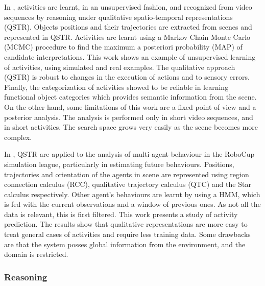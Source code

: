 In \citep{Sridhar10_PhD_UnsupervisedLearningEvent}, activities are learnt, in an unsupervised fashion, and recognized from video sequences by reasoning under qualitative spatio-temporal representations (QSTR). 
Objects positions and their trajectories are extracted from scenes and represented in QSTR.
Activities are learnt using a Markov Chain Monte Carlo (MCMC) procedure to find the maximum a posteriori probability (MAP) of candidate interpretations.
This work shows an example of unsupervised learning of activities, using simulated and real examples.
The qualitative approach (QSTR) is robust to changes in the execution of actions and to sensory errors.
Finally, the categorization of activities showed to be reliable in learning functional object categories which provides semantic information from the scene.
On the other hand, some limitations of this work are a fixed point of view and a posterior analysis.
The analysis is performed only in short video sequences, and in short activities.
The search space grows very easily as the scene becomes more complex.

In \citep{Young13_PredcitingSituatedBehaviour,Young14_EffectsTraining}, QSTR are applied to the analysis of multi-agent behaviour in the RoboCup simulation league, particularly in estimating future behaviours. 
Positions, trajectories and orientation of the agents in scene are represented using region connection calculus (RCC), qualitative trajectory calculus (QTC) and the Star calculus respectively. 
Other agent's behaviours are learnt by using a HMM, which is fed with the current observations and a window of previous ones. 
As not all the data is relevant, this is first filtered. 
This work presents a study of activity prediction.
The results show that qualitative representations are more easy to treat general cases of activities and require less training data. 
Some drawbacks are that the system posses global information from the environment, and the domain is restricted.


\subsubsection{Reasoning}



